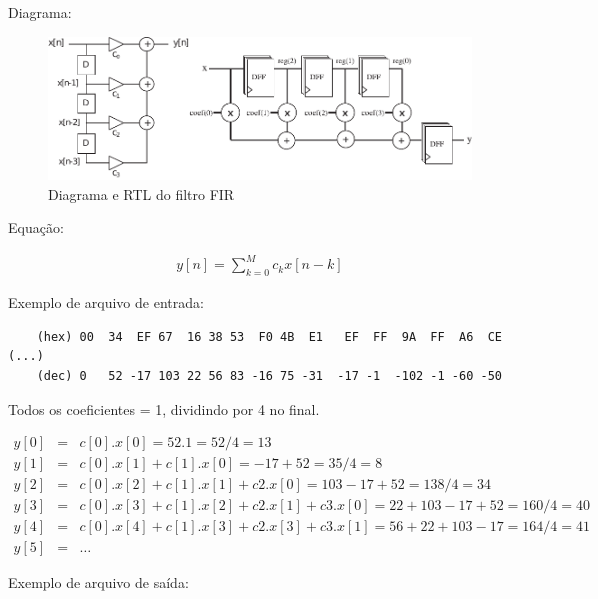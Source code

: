 \documentclass[12pt]{exam}
\begin{document}
\vspace{2cm}

\begin{questions}

	\question Diagrama:

	\begin{figure}[!htb]
		\centering
		\includegraphics[scale=1]{fir.pdf}
		\caption{Diagrama e RTL do filtro FIR}
		\label{fig:fir}
	\end{figure}

	\question Equação:

	\begin{eqnarray}
		y[n] = \sum_{k=0}^{M}c_kx[n-k]
	\end{eqnarray}

	\question Exemplo de arquivo de entrada:

	\begin{verbatim}
	(hex) 00  34  EF 67  16 38 53  F0 4B  E1   EF  FF  9A  FF  A6  CE (...)
	(dec) 0   52 -17 103 22 56 83 -16 75 -31  -17 -1  -102 -1 -60 -50
	\end{verbatim}


	\question Todos os coeficientes = 1, dividindo por 4 no final.

	\begin{eqnarray}
		y[0] &=& c[0] . x[0] = 52 . 1 = 52/4 = 13 \nonumber \\
		y[1] &=& c[0] . x[1] + c[1] . x[0] = -17 + 52 = 35 / 4 = 8 \nonumber \\
		y[2] &=& c[0] . x[2] + c[1] . x[1] + c2 . x[0] = 103 - 17 + 52 = 138/4 = 34 \nonumber \\
		y[3] &=& c[0] . x[3] + c[1] . x[2] + c2 . x[1] + c3 . x[0] = 22 + 103 - 17 + 52 = 160/4 = 40 \nonumber \\
		y[4] &=& c[0] . x[4] + c[1] . x[3] + c2 . x[3] + c3 . x[1] = 56 + 22 + 103 - 17 = 164/4 = 41 \nonumber \\
		y[5] &=& \dots \nonumber
	\end{eqnarray}

	\question Exemplo de arquivo de saída:


\end{questions}
\end{document}
